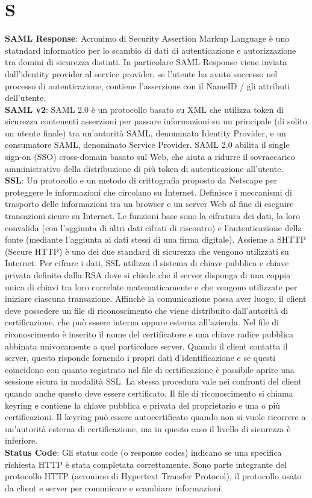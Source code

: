 \section*{S}

\textbf{SAML Response}: Acronimo di Security Assertion Markup Language è uno statndard informatico per lo scambio di dati di autenticazione e autorizzazione tra domini di sicurezza distinti. In particolare SAML Response viene inviata dall'identity provider al service provider, se l'utente ha avuto successo nel processo di autenticazione, contiene l'asserzione con il NameID / gli attributi dell'utente.\\
\textbf{SAML v2}: SAML 2.0 è un protocollo basato su XML che utilizza token di sicurezza contenenti asserzioni per passare informazioni su un principale (di solito un utente finale) tra un'autorità SAML, denominata Identity Provider, e un consumatore SAML, denominato Service Provider. SAML 2.0 abilita il single sign-on (SSO) cross-domain basato sul Web, che aiuta a ridurre il sovraccarico amministrativo della distribuzione di più token di autenticazione all'utente.\\
\textbf{SSL}: Un protocollo e un metodo di crittografia proposto da Netscape per proteggere le informazioni che circolano su Internet. 
Definisce i meccanismi di trasporto delle informazioni tra un browser e un server Web al fine di eseguire transazioni sicure su Internet. 
Le funzioni base sono la cifratura dei dati, la loro convalida (con l'aggiunta di altri dati cifrati di riscontro) e l'autenticazione della 
fonte (mediante l'aggiunta ai dati stessi di una firma digitale). Assieme a SHTTP (Secure HTTP) è uno dei due standard di sicurezza che vengono 
utilizzati su Internet. Per cifrare i dati, SSL utilizza il sistema di chiave pubblica e chiave privata definito dalla RSA dove si chiede che il server 
disponga di una coppia unica di chiavi tra loro correlate matematicamente e che vengono utilizzate per iniziare ciascuna transazione. 
Affinchè la comunicazione possa aver luogo, il client deve possedere un file di riconoscimento che viene distribuito dall'autorità di certificazione, 
che può essere interna oppure esterna all'azienda. Nel file di riconoscimento è inserito il nome del certificatore e una chiave radice pubblica abbinata 
univocamente a quel particolare server. Quando il client contatta il server, questo risponde fornendo i propri dati d'identificazione e se questi 
coincidono con quanto registrato nel file di certificazione è possibile aprire una sessione sicura in modalità SSL. La stessa procedura vale nei 
confronti del client quando anche questo deve essere certificato. Il file di riconoscimento si chiama keyring e contiene la chiave pubblica e privata 
del proprietario e una o più certificazioni. Il keyring può essere autocertificato quando non si vuole ricorrere a un'autorità esterna di certificazione, 
ma in questo caso il livello di sicurezza è inferiore.\\
\textbf{Status Code}: Gli status code (o response codes) indicano se una specifica richiesta HTTP è stata completata correttamente. Sono parte integrante del protocollo HTTP (acronimo di Hypertext Transfer Protocol), il protocollo usato da client e server per comunicare e scambiare informazioni.\\
